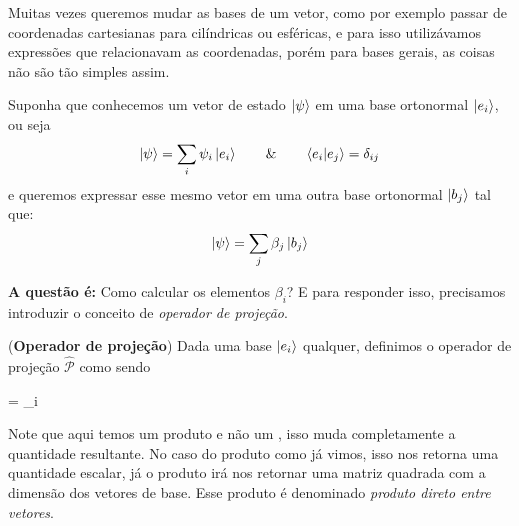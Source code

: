 Muitas vezes queremos mudar as bases de um vetor, como por exemplo passar de coordenadas cartesianas para cilíndricas ou esféricas, e para isso utilizávamos expressões que relacionavam as coordenadas, porém para bases gerais, as coisas não são tão simples assim.

Suponha que conhecemos um vetor de estado $\ket{\psi}$ em uma base ortonormal $\ket{e_{i}}$, ou seja
    \begin{equation*}
        \ket{\psi} = \sum_{i}\psi_{i}\ket{e_{i}} \qquad \& \qquad 
        \braket{e_{i}}{e_{j}} = \delta_{ij}
    \end{equation*}
e queremos expressar esse mesmo vetor em uma outra base ortonormal $\ket{b_{j}}$ tal que:
    \begin{equation*}
        \ket{\psi} = \sum_{j}\beta_{j}\ket{b_{j}}
    \end{equation*}
    
\textbf{A questão é:} Como calcular os elementos $\beta_{i}$? E para responder isso, precisamos introduzir o conceito de \textit{operador de projeção}.

\begin{definition}{}\label{def: projection operator}
    (\textbf{Operador de projeção}) Dada uma base $\ket{e_{i}}$ qualquer, definimos o operador de projeção $\hat{\mathcal{P}}$ como sendo
        \begin{answer}\label{eq: projection operador}
             = \sum_{i}
        \end{answer}
\end{definition}

Note que aqui temos um produto  e não um , isso muda completamente a quantidade resultante. No caso do produto  como já vimos, isso nos retorna uma quantidade escalar, já o produto  irá nos retornar uma matriz quadrada com a dimensão dos vetores de base. Esse produto é denominado \textit{produto direto entre vetores}.

